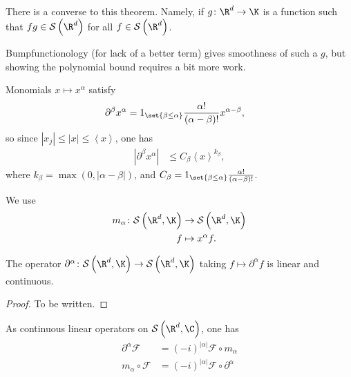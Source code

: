 \documentclass[10pt]{mypackage}
\begin{document}
\begin{remark}
  There is a converse to this theorem. Namely, if $g\colon \R^d\rightarrow \K$ is a function such that $fg\in \mathcal{S}\left( \R^d \right)$ for all $f\in \mathcal{S}\left( \R^d \right)$.

  Bumpfunctionology (for lack of a better term) gives smoothness of such a $g$, but showing the polynomial bound requires a bit more work.
\end{remark}
\begin{example}
  Monomials $x\mapsto x^{\alpha}$ satisfy
  \begin{align*}
    \partial^{\beta} x^{\alpha} &= 1_{\set{\beta\leq\alpha}} \frac{\alpha!}{\left( \alpha-\beta \right)!}x^{\alpha-\beta},
  \end{align*}
  so since $\left\vert x_j \right\vert\leq \left\vert x \right\vert\leq \left\langle x \right\rangle$, one has
  \begin{align*}
    \left\vert \partial^{\beta}x^{\alpha} \right\vert &\leq C_{\beta} \left\langle x \right\rangle^{k_{\beta}},
  \end{align*}
  where $k_{\beta} = \max\left( 0,\left\vert \alpha-\beta \right\vert \right)$, and $C_{\beta} = 1_{\set{\beta\leq\alpha}} \frac{\alpha!}{\left( \alpha-\beta \right)!}$.

  We use
  \begin{align*}
    m_{\alpha}\colon \mathcal{S}\left( \R^d,\K \right) &\rightarrow \mathcal{S}\left( \R^d,\K \right)\\
    f &\mapsto x^{\alpha}f.
  \end{align*}
\end{example}
\begin{proposition}
  The operator $\partial^{\alpha}\colon \mathcal{S}\left( \R^d,\K \right)\rightarrow \mathcal{S}\left( \R^d,\K \right)$ taking $f\mapsto \partial^{\alpha}f$ is linear and continuous.
\end{proposition}
\begin{proof}
  To be written.
\end{proof}
\begin{theorem}
  As continuous linear operators on $\mathcal{S}\left( \R^d,\C \right)$, one has
  \begin{align*}
    \partial^{\alpha} \mathcal{F} &= \left( -i \right)^{\left\vert \alpha \right\vert}\mathcal{F}\circ m_{\alpha}\\
    m_{\alpha}\circ \mathcal{F} &= \left( -i \right)^{\left\vert \alpha \right\vert}\mathcal{F} \circ \partial^{\alpha}
  \end{align*}
\end{theorem}
\end{document}
